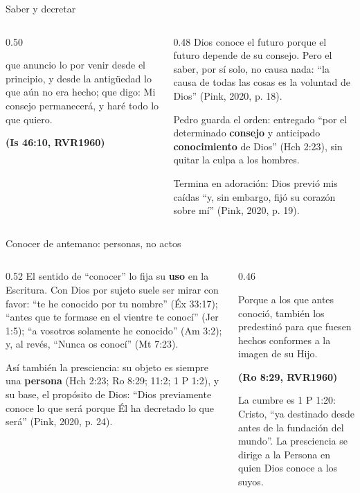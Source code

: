 \documentclass[hyperref={bookmarks=false},aspectratio=169]{beamer}
\newcommand{\fuente}[1]{\par\hfill{\upshape\bfseries\footnotesize\textcolor{azul}{#1}}}
\newcommand{\destacar}[1]{\textbf{\textcolor{azul}{#1}}}
\begin{document}
\begin{frame}{Saber y decretar}
\begin{columns}[c,onlytextwidth]
\begin{column}{0.50\textwidth}
\begin{cita}[fontupper=\scriptsize\itshape]que anuncio lo por venir desde el principio, y desde la antigüedad lo que aún no era hecho; que digo: Mi consejo permanecerá, y haré todo lo que quiero.\fuente{(Is 46:10, RVR1960)}\end{cita}
\end{column}
\begin{column}{0.48\textwidth}\scriptsize
Dios conoce el futuro porque el futuro depende de su consejo. Pero el saber, por sí solo, no causa nada: ``la causa de todas las cosas es la voluntad de Dios'' (Pink, 2020, p. 18).\par\medskip
Pedro guarda el orden: entregado ``por el determinado \destacar{consejo} y anticipado \destacar{conocimiento} de Dios'' (Hch 2:23), sin quitar la culpa a los hombres.\par\medskip
Termina en adoración: Dios previó mis caídas ``y, sin embargo, fijó su corazón sobre mí'' (Pink, 2020, p. 19).
\end{column}
\end{columns}
\end{frame}

\begin{frame}{Conocer de antemano: personas, no actos}
\begin{columns}[t,onlytextwidth]
\begin{column}{0.52\textwidth}\scriptsize
El sentido de ``conocer'' lo fija su \destacar{uso} en la Escritura. Con Dios por sujeto suele ser mirar con favor: ``te he conocido por tu nombre'' (Éx 33:17); ``antes que te formase en el vientre te conocí'' (Jer 1:5); ``a vosotros solamente he conocido'' (Am 3:2); y, al revés, ``Nunca os conocí'' (Mt 7:23).\par\medskip
Así también la presciencia: su objeto es siempre una \destacar{persona} (Hch 2:23; Ro 8:29; 11:2; 1 P 1:2), y su base, el propósito de Dios: ``Dios previamente conoce lo que será porque Él ha decretado lo que será'' (Pink, 2020, p. 24).
\end{column}
\begin{column}{0.46\textwidth}
\begin{cita}[fontupper=\scriptsize\itshape]Porque a los que antes conoció, también los predestinó para que fuesen hechos conformes a la imagen de su Hijo.\fuente{(Ro 8:29, RVR1960)}\end{cita}
\scriptsize La cumbre es 1 P 1:20: Cristo, ``ya destinado desde antes de la fundación del mundo''. La presciencia se dirige a la Persona en quien Dios conoce a los suyos.
\end{column}
\end{columns}
\end{frame}
\end{document}
